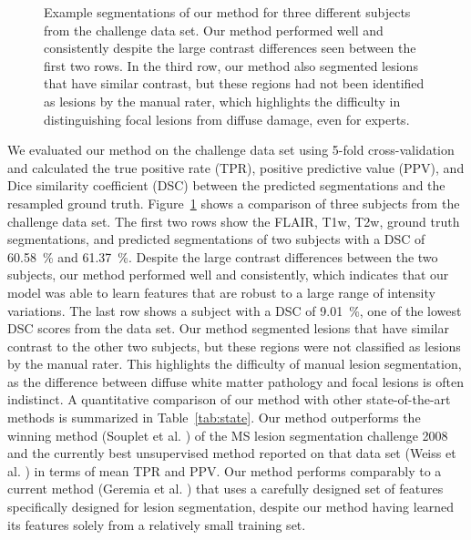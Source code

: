 \begin{figure}[tb]

\caption[Example segmentations of our method for three different subjects from
the challenge data set]{Example segmentations of our method for three different
subjects from the challenge data set. Our method performed well and consistently
despite the large contrast differences seen between the first two rows. In the
third row, our method also segmented lesions that have similar contrast, but
these regions had not been identified as lesions by the manual rater, which
highlights the difficulty in distinguishing focal lesions from diffuse damage,
even for experts.}

\label{fig:segmentation}
\end{figure}

We evaluated our method on the challenge data set using 5-fold
cross-valida\-tion and calculated the true positive rate (TPR), positive
predictive value (PPV), and Dice similarity coefficient (DSC) between the
predicted segmentations and the resampled ground truth.
Figure~\ref{fig:segmentation} shows a comparison of three subjects from the
challenge data set. The first two rows show the FLAIR, T1w, T2w, ground truth
segmentations, and predicted segmentations of two subjects with a DSC of
\SI{60.58}{\percent} and \SI{61.37}{\percent}. Despite the large contrast
differences between the two subjects, our method performed well and
consistently, which indicates that our model was able to learn features that are
robust to a large range of intensity variations. The last row shows a subject
with a DSC of \SI{9.01}{\percent}, one of the lowest DSC scores from the data
set. Our method segmented lesions that have similar contrast to the other two
subjects, but these regions were not classified as lesions by the manual rater.
This highlights the difficulty of manual lesion segmentation, as the difference
between diffuse white matter pathology and focal lesions is often indistinct. A
quantitative comparison of our method with other state-of-the-art methods is
summarized in Table~\ref{tab:state}. Our method outperforms the winning method
(Souplet et al. \cite{souplet2008}) of the MS lesion segmentation challenge 2008
and the currently best unsupervised method reported on that data set (Weiss et
al. \cite{weiss2013}) in terms of mean TPR and PPV. Our method performs
comparably to a current method (Geremia et al. \cite{geremia2010}) that uses a
carefully designed set of features specifically designed for lesion
segmentation, despite our method having learned its features solely from a
relatively small training set.

